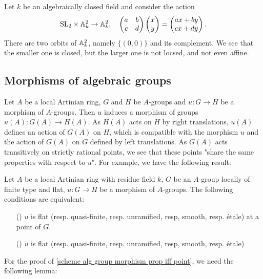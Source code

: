 \begin{example}
Let $k$ be an algebraically closed field and consider the action
\[\mathrm{SL}_2\times\mathbb{A}_k^2\to \mathbb{A}_k^2,\quad \begin{pmatrix}
a&b\\
c&d
\end{pmatrix}\begin{pmatrix}
x\\
y
\end{pmatrix}=\begin{pmatrix}
ax+by\\
cx+dy
\end{pmatrix}.\]
There are two orbits of $\mathbb{A}_k^2$, namely $\{(0,0)\}$ and its complement. We see that the smaller one is closed, but the larger one is not locsed, and not even affine.
\end{example}

\subsection{Morphisms of algebraic groups}
Let $A$ be a local Artinian ring, $G$ and $H$ be $A$-groups and $u:G\to H$ be a morphism of $A$-groups. Then $u$ induces a morphism of groups $u(A):G(A)\to H(A)$. As $H(A)$ acts on $H$ by right translations, $u(A)$ defines an action of $G(A)$ on $H$, which is compatible with the morphism $u$ and the action of $G(A)$ on $G$ defined by left translations. As $G(A)$ acts transitively on strictly rational points, we see that these points "share the same properties with respect to $u$". For example, we have the following result:

\begin{proposition}\label{scheme alg group morphism prop iff point}
Let $A$ be a local Artinian ring with residue field $k$, $G$ be an $A$-group locally of finite type and flat, $u:G\to H$ be a morphism of $A$-groups. The following conditions are equivalent:
\begin{enumerate}
    \item[(\rmnum{1})] $u$ is flat (resp. quasi-finite, resp. unramified, resp, smooth, resp. \'etale) at a point of $G$.
    \item[(\rmnum{2})] $u$ is flat (resp. quasi-finite, resp. unramified, resp, smooth, resp. \'etale)
\end{enumerate}
\end{proposition}
For the proof of \cref{scheme alg group morphism prop iff point}, we need the following lemma:

